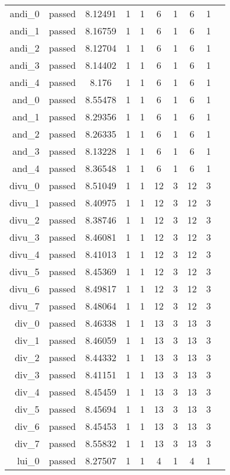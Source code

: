 \begin{longtable}{r|ccccccccc}
    andi\_0 & passed & 8.12491 & 1 & 1 & 6 & 1 & 6 & 1 \\
    andi\_1 & passed & 8.16759 & 1 & 1 & 6 & 1 & 6 & 1 \\
    andi\_2 & passed & 8.12704 & 1 & 1 & 6 & 1 & 6 & 1 \\
    andi\_3 & passed & 8.14402 & 1 & 1 & 6 & 1 & 6 & 1 \\
    andi\_4 & passed & 8.176 & 1 & 1 & 6 & 1 & 6 & 1 \\
    and\_0 & passed & 8.55478 & 1 & 1 & 6 & 1 & 6 & 1 \\
    and\_1 & passed & 8.29356 & 1 & 1 & 6 & 1 & 6 & 1 \\
    and\_2 & passed & 8.26335 & 1 & 1 & 6 & 1 & 6 & 1 \\
    and\_3 & passed & 8.13228 & 1 & 1 & 6 & 1 & 6 & 1 \\
    and\_4 & passed & 8.36548 & 1 & 1 & 6 & 1 & 6 & 1 \\
    divu\_0 & passed & 8.51049 & 1 & 1 & 12 & 3 & 12 & 3 \\
    divu\_1 & passed & 8.40975 & 1 & 1 & 12 & 3 & 12 & 3 \\
    divu\_2 & passed & 8.38746 & 1 & 1 & 12 & 3 & 12 & 3 \\
    divu\_3 & passed & 8.46081 & 1 & 1 & 12 & 3 & 12 & 3 \\
    divu\_4 & passed & 8.41013 & 1 & 1 & 12 & 3 & 12 & 3 \\
    divu\_5 & passed & 8.45369 & 1 & 1 & 12 & 3 & 12 & 3 \\
    divu\_6 & passed & 8.49817 & 1 & 1 & 12 & 3 & 12 & 3 \\
    divu\_7 & passed & 8.48064 & 1 & 1 & 12 & 3 & 12 & 3 \\
    div\_0 & passed & 8.46338 & 1 & 1 & 13 & 3 & 13 & 3 \\
    div\_1 & passed & 8.46059 & 1 & 1 & 13 & 3 & 13 & 3 \\
    div\_2 & passed & 8.44332 & 1 & 1 & 13 & 3 & 13 & 3 \\
    div\_3 & passed & 8.41151 & 1 & 1 & 13 & 3 & 13 & 3 \\
    div\_4 & passed & 8.45459 & 1 & 1 & 13 & 3 & 13 & 3 \\
    div\_5 & passed & 8.45694 & 1 & 1 & 13 & 3 & 13 & 3 \\
    div\_6 & passed & 8.45453 & 1 & 1 & 13 & 3 & 13 & 3 \\
    div\_7 & passed & 8.55832 & 1 & 1 & 13 & 3 & 13 & 3 \\
    lui\_0 & passed & 8.27507 & 1 & 1 & 4 & 1 & 4 & 1 \\

\end{longtable}

